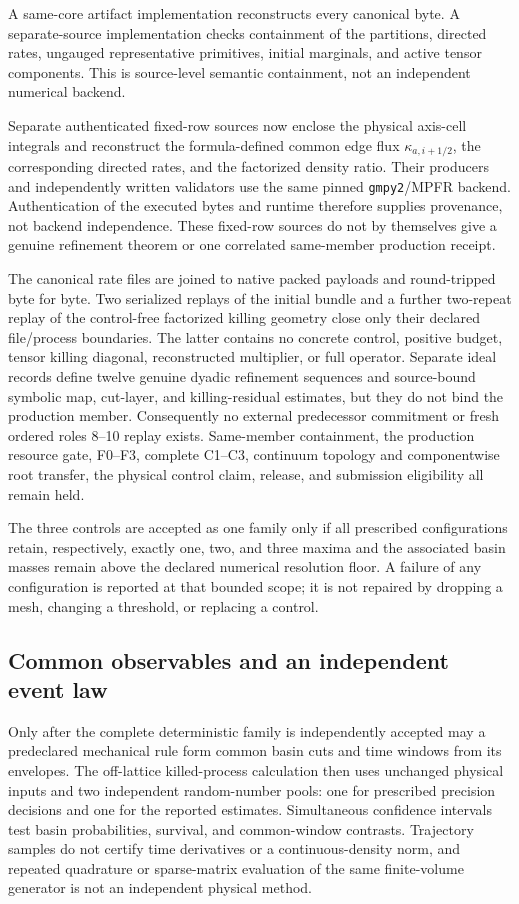 \documentclass[aps,physrev,reprint,amsmath,amssymb,longbibliography,floatfix]{revtex4-2}
\begin{document}
A same-core artifact implementation reconstructs every canonical byte.  A
separate-source implementation checks containment of the partitions, directed
rates, ungauged representative primitives, initial marginals, and active
tensor components.  This is source-level semantic containment, not an
independent numerical backend.

Separate authenticated fixed-row sources now enclose the physical axis-cell
integrals and reconstruct the formula-defined common edge flux
\(\kappa_{a,i+1/2}\), the corresponding directed rates, and the factorized
density ratio.  Their producers and independently written validators use the
same pinned \texttt{gmpy2}/MPFR backend.  Authentication of the executed bytes
and runtime therefore supplies provenance, not backend independence.  These
fixed-row sources do not by themselves give a genuine refinement theorem or
one correlated same-member production receipt.

The canonical rate files are joined to native packed payloads and
round-tripped byte for byte.  Two serialized replays of the initial bundle and
a further two-repeat replay of the control-free factorized killing geometry
close only their declared file/process boundaries.  The latter contains no
concrete control, positive budget, tensor killing diagonal, reconstructed
multiplier, or full operator.  Separate ideal records define twelve genuine
dyadic refinement sequences and source-bound symbolic map, cut-layer, and
killing-residual estimates, but they do not bind the production member.
Consequently no external predecessor commitment or fresh ordered roles
8--10 replay exists.  Same-member containment, the production resource gate,
F0--F3, complete C1--C3, continuum topology and componentwise root transfer,
the physical control claim, release, and submission eligibility all remain
held.

The three controls are accepted as one family only if all prescribed
configurations retain, respectively, exactly one, two, and three maxima and
the associated basin masses remain above the declared numerical resolution
floor.  A failure of any configuration is reported at that bounded scope; it
is not repaired by dropping a mesh, changing a threshold, or replacing a
control.

\subsection{Common observables and an independent event law}

Only after the complete deterministic family is independently accepted may a
predeclared mechanical rule form common basin cuts and time windows from its
envelopes.  The off-lattice killed-process calculation then uses unchanged
physical inputs and two independent random-number pools: one for prescribed
precision decisions and one for the reported estimates.  Simultaneous
confidence intervals test basin probabilities, survival, and common-window
contrasts.
Trajectory samples do not certify time derivatives or a continuous-density
norm, and repeated quadrature or sparse-matrix evaluation of the same
finite-volume generator is not an independent physical method.
\end{document}
